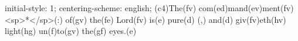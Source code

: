 initial-style: 1;
centering-scheme: english;
(c4)The(fv) com(ed)mand(ev)ment(fv) <sp>*</sp>(:) of(gv) the(fe) Lord(fv) is(e) pure(d) (,) and(d) giv(fv)eth(hv) light(hg) un(f)to(gv) the(gf) eyes.(e)

